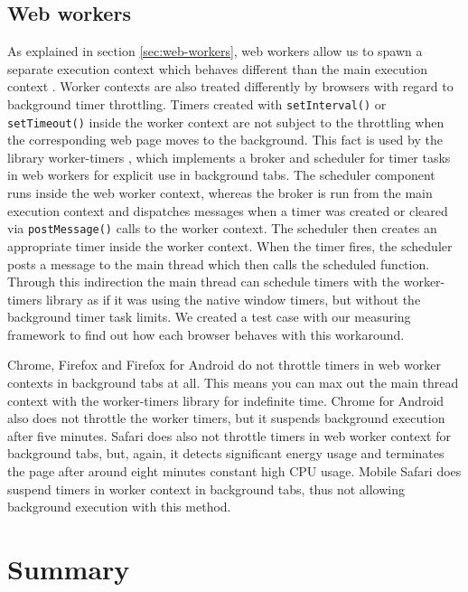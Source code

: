 \documentclass[
	ruledheaders=section,%
	class=report,%
	thesis={type=bachelor},%
	accentcolor=9c,%
	custommargins=true,%
	marginpar=false,%
	parskip=half-,%
	fontsize=11pt,%
]{tudapub}
\begin{document}
  
  \subsection{Web workers}

  As explained in section \ref{sec:web-workers}, web workers allow us to spawn a separate execution context which behaves different than the main execution context \cite{mdn-worker}. Worker contexts are also treated differently by browsers with regard to background timer throttling. Timers created with \texttt{setInterval()} or \texttt{setTimeout()} inside the worker context are not subject to the throttling when the corresponding web page moves to the background. This fact is used by the library worker-timers \cite{worker-timers}, which implements a broker and scheduler for timer tasks in web workers for explicit use in background tabs. The scheduler component runs inside the web worker context, whereas the broker is run from the main execution context and dispatches messages when a timer was created or cleared via \texttt{postMessage()} calls to the worker context. The scheduler then creates an appropriate timer inside the worker context. When the timer fires, the scheduler posts a message to the main thread which then calls the scheduled function. Through this indirection the main thread can schedule timers with the worker-timers library as if it was using the native window timers, but without the background timer task limits. We created a test case with our measuring framework to find out how each browser behaves with this workaround.
  
  Chrome, Firefox and Firefox for Android do not throttle timers in web worker contexts in background tabs at all. This means you can max out the main thread context with the worker-timers library for indefinite time. Chrome for Android also does not throttle the worker timers, but it suspends background execution after five minutes. Safari does also not throttle timers in web worker context for background tabs, but, again, it detects significant energy usage and terminates the page after around eight minutes constant high CPU usage. Mobile Safari does suspend timers in worker context in background tabs, thus not allowing background execution with this method.
  
  
  \section{Summary}
\end{document}
